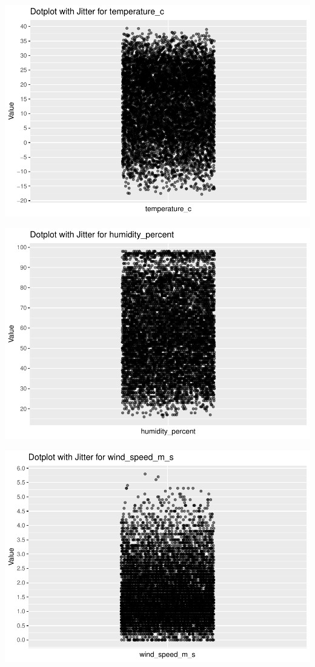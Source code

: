 \documentclass[
  11pt,
  letterpaper,
]{article}
\begin{document}
\begin{center}\includegraphics[width=1.2\linewidth,]{Final_Project_files/figure-latex/unnamed-chunk-13-2} \end{center}

\begin{center}\includegraphics[width=1.2\linewidth,]{Final_Project_files/figure-latex/unnamed-chunk-13-3} \end{center}

\begin{center}\includegraphics[width=1.2\linewidth,]{Final_Project_files/figure-latex/unnamed-chunk-13-4} \end{center}
\end{document}

